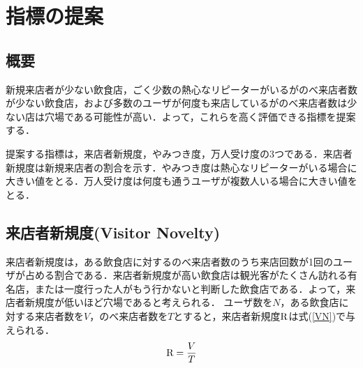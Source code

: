 \chapter{指標の提案}
\label{chap:proposal}

\section{概要}
新規来店者が少ない飲食店，ごく少数の熱心なリピーターがいるがのべ来店者数が少ない飲食店，および多数のユーザが何度も来店しているがのべ来店者数は少ない店は穴場である可能性が高い．よって，これらを高く評価できる指標を提案する．\par
提案する指標は，来店者新規度，やみつき度，万人受け度の3つである．来店者新規度は新規来店者の割合を示す．やみつき度は熱心なリピーターがいる場合に大きい値をとる．万人受け度は何度も通うユーザが複数人いる場合に大きい値をとる．


\section{来店者新規度(Visitor Novelty)}

来店者新規度は，ある飲食店に対するのべ来店者数のうち来店回数が1回のユーザが占める割合である．来店者新規度が高い飲食店は観光客がたくさん訪れる有名店，または一度行った人がもう行かないと判断した飲食店である．よって，来店者新規度が低いほど穴場であると考えられる．
ユーザ数を$N$，ある飲食店に対する来店者数を$V$，のべ来店者数を$T$とすると，来店者新規度$\rm R$は式(\ref{VN})で与えられる．
\begin{equation}
	\label{equ:VN}
	{\rm R} = \frac{V}{T}
\end{equation}


